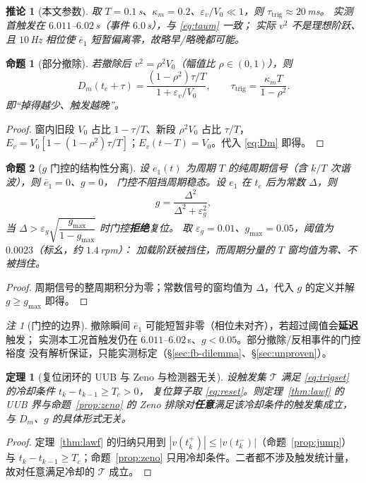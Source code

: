 \documentclass[11pt,a4paper]{article}
\newtheorem{theorem}{定理}
\newtheorem{proposition}{命题}
\newtheorem{corollary}{推论}
\theoremstyle{remark}
\newtheorem{remark}{注}
\begin{document}
\begin{corollary}[本文参数]\label{cor:dmnum}
取 $T=0.1$\,s、$\kappa_m=0.2$、$\varepsilon_v/V_0\ll1$，则 $\tau_{\mathrm{trig}}\approx20$\,ms。
实测首触发在 $6.011$--$6.02$\,s（事件 $6.0$\,s），与 \eqref{eq:taum} 一致；
实际 $v^2$ 不是理想阶跃、且 $10$\,Hz 相位使 $\bar e_1$ 短暂偏离零，故略早/略晚都可能。
\end{corollary}

\begin{proposition}[部分撤除]\label{prop:dmpart}
若撤除后 $v^2=\rho^2V_0$（幅值比 $\rho\in(0,1)$），则
\begin{equation}
D_m(t_e+\tau)=\frac{(1-\rho^2)\tau/T}{1+\varepsilon_v/V_0},
\qquad
\tau_{\mathrm{trig}}=\frac{\kappa_m T}{1-\rho^2}.
\label{eq:dmpart}
\end{equation}
即“掉得越少、触发越晚”。
\end{proposition}
\begin{proof}
窗内旧段 $V_0$ 占比 $1-\tau/T$、新段 $\rho^2V_0$ 占比 $\tau/T$，
$E_v=V_0[1-(1-\rho^2)\tau/T]$；$E_v(t-T)=V_0$。代入 \eqref{eq:Dm} 即得。
\end{proof}

\begin{proposition}[$g$ 门控的结构性分离]\label{prop:ggate}
设 $e_1(t)$ 为周期 $T$ 的纯周期信号（含 $k/T$ 次谐波），则 $\bar e_1=0$、$g=0$，
门控不阻挡周期稳态。设 $e_1$ 在 $t_e$ 后为常数 $\Delta$，则
\begin{equation}
g=\frac{\Delta^2}{\Delta^2+\varepsilon_g^2} ,
\label{eq:gstep}
\end{equation}
当 $\Delta>\varepsilon_g\sqrt{\dfrac{g_{\max}}{1-g_{\max}}}$ 时门控\textbf{拒绝}复位。
取 $\varepsilon_g=0.01$、$g_{\max}=0.05$，阈值为 $0.0023$（标幺，约 $1.4$\,rpm）：
加载阶跃被挡住，而周期分量的 $T$ 窗均值为零、不被挡住。
\end{proposition}
\begin{proof}
周期信号的整周期积分为零；常数信号的窗均值为 $\Delta$，代入 $g$ 的定义并解
$g\ge g_{\max}$ 即得。
\end{proof}

\begin{remark}[门控的边界]\label{rem:gbound}
撤除瞬间 $\bar e_1$ 可能短暂非零（相位未对齐），若超过阈值会\textbf{延迟}触发；
实测本工况首触发仍在 $6.011$--$6.02$\,s、$g<0.05$。部分撤除/反相事件的门控裕度
没有解析保证，只能实测标定（\S\ref{sec:fb-dilemma}、\S\ref{sec:unproven}）。
\end{remark}

\begin{theorem}[复位闭环的 UUB 与 Zeno 与检测器无关]\label{thm:trigger-independent}
设触发集 $\mathcal T$ 满足 \eqref{eq:trigset} 的冷却条件 $t_k-t_{k-1}\ge T_c>0$，
复位算子取 \eqref{eq:reset}。则定理~\ref{thm:lawf} 的 UUB 界与命题~\ref{prop:zeno}
的 Zeno 排除对\textbf{任意}满足该冷却条件的触发集成立，与 $D_m$、$g$ 的具体形式无关。
\end{theorem}
\begin{proof}
定理~\ref{thm:lawf} 的归纳只用到 $|v(t_k^+)|\le|v(t_k^-)|$（命题~\ref{prop:jump}）
与 $t_k-t_{k-1}\ge T_c$；命题~\ref{prop:zeno} 只用冷却条件。二者都不涉及触发统计量，
故对任意满足冷却的 $\mathcal T$ 成立。
\end{proof}
\end{document}
